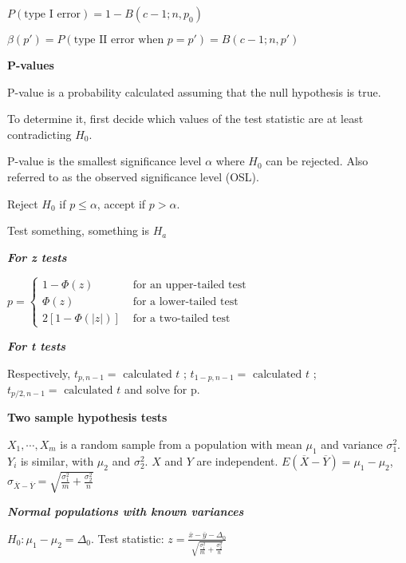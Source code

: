 \documentclass{article}
\newcommand{\bigtitle}[1]{
	\noindent
	\textbf{#1}
}
\newcommand{\smalltitle}[1]{
	\noindent
	\textbf{\textit{#1}}
}
\newcommand{\properframed}[1]{
	{
		\centering
		\vspace{-2 ex}
		\begin{framed}
			\vspace{-1.5 ex}
			#1
			\vspace{-1.5 ex}
		\end{framed}
		\vspace{-2 ex}
	}
}
\begin{document}
	$
	P(\text{type I error}) = 1-B(c-1; n , p_0)
	$
	
	$\beta(p') = P(\text{type II error when } p = p') = B(c-1;n,p')$
	
	\bigtitle{P-values}
	
	P-value is a probability calculated assuming that the null hypothesis is true.
	
	To determine it, first decide which values of the test statistic are at least contradicting $H_0$.
	
	\noindent
	P-value is the smallest significance level $\alpha$ where $H_0$ can be rejected. Also referred to as the observed significance level (OSL).
	
	\properframed{
		
		Reject $H_0$ if $p\leq \alpha$, accept if $p > \alpha$.
		
		\noindent
		{\Large
			\color{red}
			Test something, something is $H_a$
			\color{black}
		}
		
	}
	
	\smalltitle{For z tests}
	
	$p = \left\{ \begin{array}
	{ cc } { 1 - \Phi ( z ) }   & { \text { for an upper-tailed test } } \\
	{ \Phi ( z ) }               & { \text { for a lower-tailed test } }  \\
	{ 2 [ 1 - \Phi ( | z | ) ] } & { \text { for a two-tailed test } }
	\end{array} \right.$
	
	\smalltitle{For t tests}
	
	Respectively, $t_{p,n-1} = \text{ calculated } t$ ; 
	$t_{1-p,n-1} = \text{ calculated } t$ ; 
	$t_{p/2,n-1} = \text{ calculated } t$ and solve for p.
	
	\bigtitle{Two sample hypothesis tests}
	
	$X_1, \cdots, X_m$ is a random sample from a population with mean $\mu_1$ and variance $\sigma_1^2$. $Y_i$ is similar, with $\mu_2$ and $\sigma_2^2$. $X$ and $Y$ are independent.
	$E(\overline{ X }-\overline{Y}) = \mu_1-\mu_2$,
	$\sigma _ { \overline { X } - \overline { Y } } = \sqrt { \frac { \sigma _ { 1 } ^ { 2 } } { m } + \frac { \sigma _ { 2 } ^ { 2 } } { n } }$
	
	\smalltitle{Normal populations with known variances}
	
	$H_0: \mu_1-\mu_2 = \Delta_0$. Test statistic: $z = \frac { \overline { x } - \overline { y } - \Delta _ { 0 } } { \sqrt { \frac { \sigma _ { 1 } ^ { 2 } } { m } + \frac { \sigma _ { 2 } ^ { 2 } } { n } } }$
	
\end{document}

